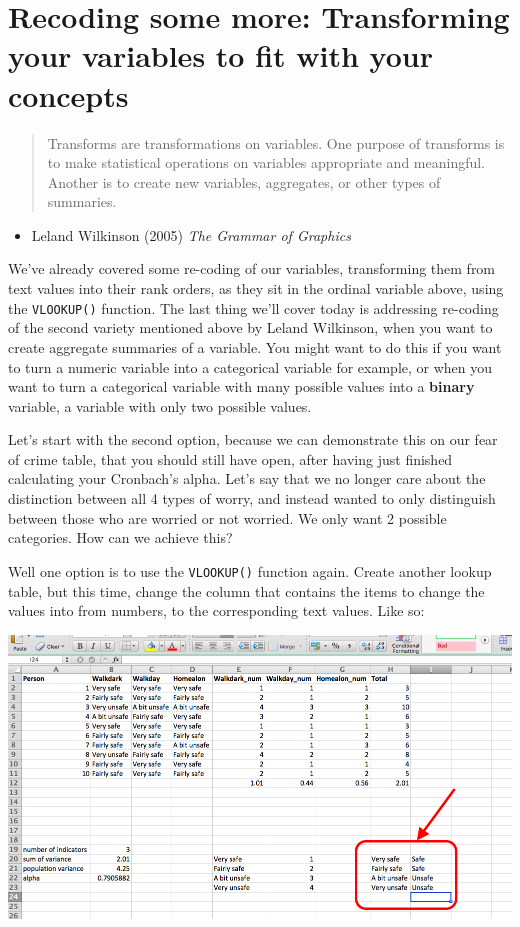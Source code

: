 \documentclass[
]{book}
\providecommand{\tightlist}{%
  \setlength{\itemsep}{0pt}\setlength{\parskip}{0pt}}
\begin{document}
\hypertarget{recoding-some-more-transforming-your-variables-to-fit-with-your-concepts}{%
\section{Recoding some more: Transforming your variables to fit with your concepts}\label{recoding-some-more-transforming-your-variables-to-fit-with-your-concepts}}

\begin{quote}
Transforms are transformations on variables. One purpose of transforms is to make statistical operations on variables appropriate and meaningful. Another is to create new variables, aggregates, or other types of summaries.
\end{quote}

\begin{itemize}
\tightlist
\item
  Leland Wilkinson (2005) \emph{The Grammar of Graphics}
\end{itemize}

We've already covered some re-coding of our variables, transforming them from text values into their rank orders, as they sit in the ordinal variable above, using the \texttt{VLOOKUP()} function. The last thing we'll cover today is addressing re-coding of the second variety mentioned above by Leland Wilkinson, when you want to create aggregate summaries of a variable. You might want to do this if you want to turn a numeric variable into a categorical variable for example, or when you want to turn a categorical variable with many possible values into a \textbf{binary} variable, a variable with only two possible values.

Let's start with the second option, because we can demonstrate this on our fear of crime table, that you should still have open, after having just finished calculating your Cronbach's alpha. Let's say that we no longer care about the distinction between all 4 types of worry, and instead wanted to only distinguish between those who are worried or not worried. We only want 2 possible categories. How can we achieve this?

Well one option is to use the \texttt{VLOOKUP()} function again. Create another lookup table, but this time, change the column that contains the items to change the values into from numbers, to the corresponding text values. Like so:

\includegraphics{imgs/new_lookup_tab.png}
\end{document}
